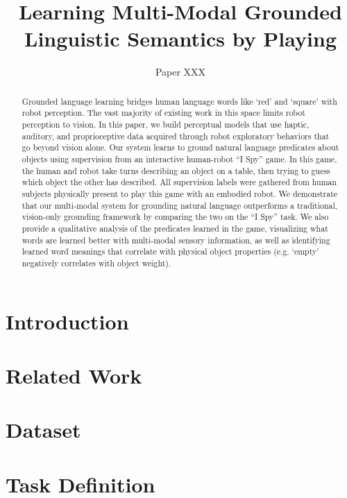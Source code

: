 \documentclass{article}
\title{Learning Multi-Modal Grounded Linguistic Semantics by Playing \ispy}
\author{Paper XXX}
\newcommand{\ispy}{``I Spy''\xspace}
\begin{document}
\maketitle

\begin{abstract}
Grounded language learning bridges human language words like `red' and `square' with robot perception.
The vast majority of existing work in this space limits robot perception to vision.
In this paper, we build perceptual models that use haptic, auditory, and proprioceptive data acquired through robot exploratory behaviors that go beyond vision alone.
Our system learns to ground natural language predicates about objects using supervision from an interactive human-robot \ispy game.
In this game, the human and robot take turns describing an object on a table, then trying to guess which object the other has described.
All supervision labels were gathered from human subjects physically present to play this game with an embodied robot.
We demonstrate that our multi-modal system for grounding natural language outperforms a traditional, vision-only grounding framework by comparing the two on the \ispy task.
We also provide a qualitative analysis of the predicates learned in the game, visualizing what words are learned better with multi-modal sensory information, as well as identifying learned word meanings that correlate with physical object properties (e.g. `empty' negatively correlates with object weight).
\end{abstract}

\section{Introduction}
\label{sec:introduction}
	

\section{Related Work}
\label{sec:relatedwork}
	

\section{Dataset}
\label{sec:dataset}
	

\section{Task Definition}
\label{sec:taskdefinition}
	
\end{document}
